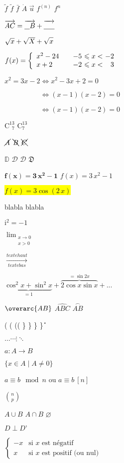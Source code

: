 \documentclass[12pt,a4paper,oneside,twocolumn]{article} %
\numberwithin{equation}{section}
\begin{document}
$\widetilde{f}$ $\tilde{f}$ $\bar{f}$ $ \dot{A} $ $ \vec{u} $ $ f^{(n)} $  $f^n$



$\overrightarrow{AC}=\overrightarrow{%
\underline{\phantom{A}}B}+\overrightarrow{%
\underline{\phantom{AB}}}$

$\sqrt{x} + \sqrt{X} + \sqrt{\vphantom{X}x}$

$f(x)=\left\{\begin{array}{%
l @{\qquad} r @{~\leqslant x <~} l}
x^2-24 & -5 & -2\\
x+2 & -2 & \phantom{-}3
\end{array}\right.$

$x^2=3x-2 \iff x^2-3x+2=0$\par
$\phantom{x^2=3x-2} \iff (x-1)(x-2)=0$\par
$\phantom{x^2=3x-2} \iff (x-1)(x-2)=0$

$\textrm{C}^{13}_{\phantom{1}7}$  $\textrm{C}^{13}_{7}$

$\cancel{A}$ $\bcancel{B}$ $\xcancel{C}$

$\mathbb{D}$  $\mathcal{D}$  $\mathscr{D}$  $\mathfrak{D}$

$\bm{f(x)=3\,x^2-1}$ $ f(x)=3\,x^2-1 $

\colorbox{yellow}{$f(x)=3\cos(2\,x)$}

{\setlength{\mathsurround}{20pt}
blabla  blabla}

$ \boxed{\mathrm{i}^2=-1}$

$\lim_{\substack{x \to 0 \\ x > 0}}$

$  \xrightarrow[texte bas]{texte haut} $

$\underbrace{\cos^2x+\sin^2x}_{=1}
+\overbrace{2\cos x\sin x}^{=\sin 2x}+...$

$\overarc{AB}$
$\widehat{ABC}$
$\overset{\frown}{AB}$

\big( \Big( \bigg (\Bigg(
\big\} \Big\} \bigg\} \Bigg\}
\big\| \Big\| \bigg\| \Bigg\|

$ \ldots \cdots \vdots \ddots $

$a \colon A \to B$

$\{x \in A \mid A \neq 0\}$

$a \equiv b \mod n$ ou $a \equiv b \ [n]$

$\binom{n}{p}$

$A \cup B$ $A \cap B$    $\varnothing$

$D \perp D’$

$\begin{cases}
-x & \text{si $x$ est négatif} \\
x & \text{si $x$ est positif (ou nul)}
\end{cases}$
\end{document}
